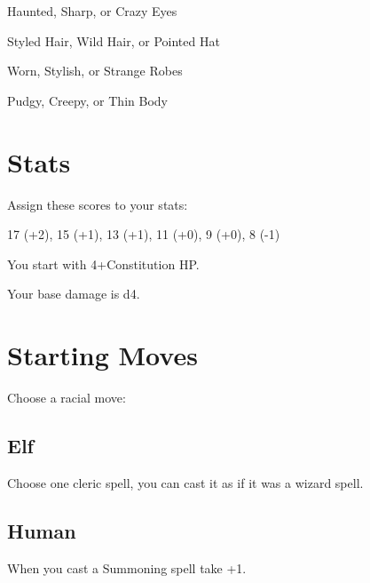          

Haunted, Sharp, or Crazy Eyes

         

Styled Hair, Wild Hair, or Pointed Hat

         

Worn, Stylish, or Strange Robes

         

Pudgy, Creepy, or Thin Body

       

       
\section{Stats}   
       

         

Assign these scores to your stats:

         

17 (+2), 15 (+1), 13 (+1), 11 (+0), 9 (+0), 8 (-1)

         

You start with 4+Constitution HP.

       

       

Your base damage is d4.

       
\section{Starting Moves}   
       

         
\startInstructionsAfterHeader
Choose a racial move:
\stopInstructionsAfterHeader
         

           
\subsection{Elf}   
           

Choose one cleric spell, you can cast it as if it was a wizard spell.

           
\subsection{Human}   
           

When you cast a Summoning spell take +1.


